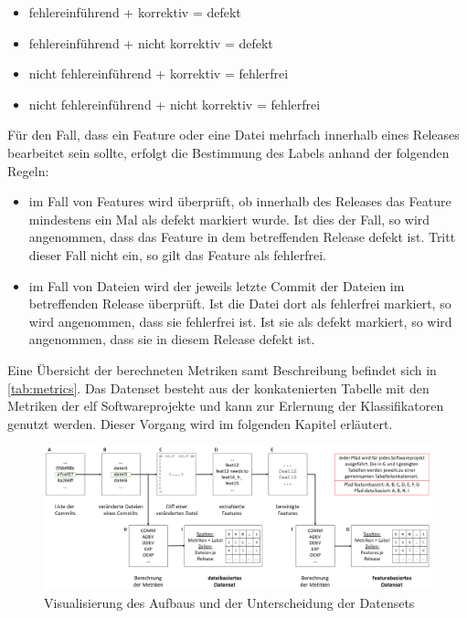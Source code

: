 \begin{itemize}
\setlength{\itemsep}{-2pt}
\item fehlereinführend + korrektiv = defekt
\item fehlereinführend + nicht korrektiv = defekt
\item nicht fehlereinführend + korrektiv = fehlerfrei
\item nicht fehlereinführend + nicht korrektiv = fehlerfrei 
\end{itemize}

Für den Fall, dass ein Feature oder eine Datei mehrfach innerhalb eines Releases bearbeitet sein sollte, erfolgt die Bestimmung des Labels anhand der folgenden Regeln:

\begin{itemize}
\setlength{\itemsep}{-2pt}
\item im Fall von Features wird überprüft, ob innerhalb des Releases das Feature mindestens ein Mal als \glqq defekt\grqq{} markiert wurde. Ist dies der Fall, so wird angenommen, dass das Feature in dem betreffenden Release defekt ist. Tritt dieser Fall nicht ein, so gilt das Feature als fehlerfrei.
\item im Fall von Dateien wird der jeweils letzte Commit der Dateien im betreffenden Release überprüft. Ist die Datei dort als \glqq fehlerfrei\grqq{} markiert, so wird angenommen, dass sie fehlerfrei ist. Ist sie als \glqq defekt\grqq{} markiert, so wird angenommen, dass sie in diesem Release defekt ist.
\end{itemize}


Eine Übersicht der berechneten Metriken samt Beschreibung befindet sich in \autoref{tab:metrics}. Das Datenset besteht aus der konkatenierten Tabelle mit den Metriken der elf Softwareprojekte und kann zur Erlernung der Klassifikatoren genutzt werden. Dieser Vorgang wird im folgenden Kapitel erläutert.

\begin{figure}[H]
    \centering
    \includegraphics[width=\textwidth]{images/Dataset}
    \caption{Visualisierung des Aufbaus und der Unterscheidung der Datensets\label{fig:dataset}}
\end{figure}

